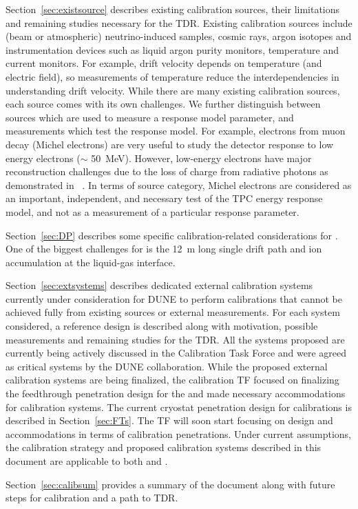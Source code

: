 Section~\ref{sec:existsource} describes existing calibration sources, their limitations and remaining studies necessary for the TDR. Existing calibration sources include (beam or atmospheric)  neutrino-induced samples, cosmic rays, argon isotopes and instrumentation devices such as liquid argon purity monitors, temperature and current monitors. For example, drift velocity depends on temperature (and electric field), so measurements of temperature reduce the interdependencies in understanding drift velocity. While there are many existing calibration sources, each source comes with its own challenges. We further distinguish between sources which are used to measure a response model parameter, and measurements which test the response model. For example, electrons from 
muon decay (Michel electrons) are very useful to study the detector response to low energy electrons ($\sim$ \SI{50}{\MeV}). However, low-energy electrons have major reconstruction challenges due to the loss of charge from radiative photons as demonstrated in ~\cite{Acciarri:2017sjy}. In terms of source category, Michel electrons are considered as an important, independent, and necessary test of the TPC energy response model, and not as a measurement of a particular response parameter.

Section~\ref{sec:DP} describes some specific calibration-related considerations for . One of the biggest challenges for  is the \SI{12}{\m} long single drift path and ion accumulation at the liquid-gas interface.

Section~\ref{sec:extsystems} describes dedicated external calibration systems currently under consideration for DUNE to perform calibrations that cannot be achieved fully from existing sources or external measurements. For each system considered, a reference design is described along with motivation, possible measurements and remaining studies for the TDR. All the systems proposed are currently being actively discussed in the Calibration Task Force and were agreed as critical systems by the DUNE collaboration. While the proposed external calibration systems are being finalized, the calibration TF focused on finalizing the feedthrough penetration design for the  and made necessary accommodations for calibration systems. The current cryostat penetration design for  calibrations is described in Section~\ref{sec:FTs}. The TF will soon start focusing on  design and accommodations in terms of calibration penetrations. Under current assumptions, the calibration strategy and proposed calibration systems described in this document are applicable to both  and . 

Section~\ref{sec:calibsum} provides a summary of the document along with future steps for calibration and a path to TDR. 
 
    